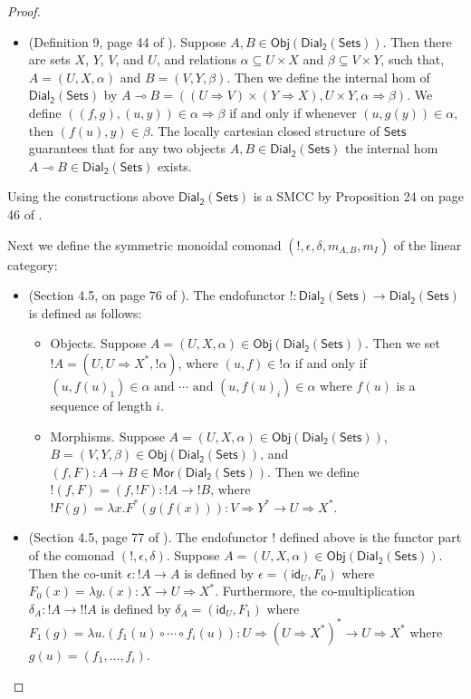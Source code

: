 \documentclass{elsarticle}
\newcommand{\limp}[0]{\multimap}
\newcommand{\dial}[0]{\mathsf{Dial_2}(\mathsf{Sets})}
\newcommand{\sets}[0]{\mathsf{Sets}}
\newcommand{\obj}[1]{\mathsf{Obj}(#1)}
\newcommand{\mor}[1]{\mathsf{Mor(#1)}}
\begin{document}
\begin{proof}
\begin{report}
\begin{center}
\begin{itemize}
    \item (Definition 9, page 44 of \cite{dePaiva:1988}). Suppose
      $A,B \in \obj{\dial}$.  Then there are sets $X$, $Y$, $V$, and
      $U$, and relations $\alpha \subseteq U \times X$ and
      $\beta \subseteq V \times Y$, such that, $A = (U,X,\alpha)$ and
      $B = (V,Y,\beta)$.  Then we define the internal hom of $\dial$
      by $A \limp B = ((U \Rightarrow V) \times (Y \Rightarrow X),U
      \times Y,\alpha \Rightarrow \beta)$.  We define $((f,g),(u,y))
      \in \alpha \Rightarrow \beta$ if and only if whenever $(u,g(y))
      \in \alpha$, then $(f(u),y) \in \beta$.  The locally cartesian 
      closed structure of $\sets$ guarantees that for any two objects $A, B \in
      \dial$ the internal hom $A \limp B \in \dial$ exists.      
    \end{itemize}
  \end{center}
  Using the constructions above $\dial$ is a SMCC by Proposition 24
  on page 46 of \cite{dePaiva:1988}.  

  Next we define the symmetric monoidal comonad
  $(!,\epsilon,\delta,m_{A,B},m_I)$ of the linear category:
  \begin{center}
    \begin{itemize}
    \item (Section 4.5, on page 76 of \cite{dePaiva:1988}). The
      endofunctor $! : \dial \to \dial$ is defined as follows:
      \begin{itemize}
      \item Objects. Suppose $A = (U,X,\alpha) \in \obj{\dial}$.  Then
        we set $!A = (U,U \Rightarrow X^*, !\alpha)$, where
        $(u,f) \in !\alpha$ if and only if
        $(u,f(u)_1) \in \alpha \text{ and } \cdots \text{ and }
        (u,f(u)_i) \in \alpha$ where $f(u)$ is a sequence of length $i$.

      \item Morphisms. Suppose $A = (U,X,\alpha) \in \obj{\dial}$,
        $B = (V,Y,\beta) \in \obj{\dial}$, and
        $(f,F) : A \to B \in \mor{\dial}$.  Then we define 
        $!(f,F) = (f,!F) : !A \to !B$, where $!F(g) = \lambda
        x.F^*(g(f(x))) : V \Rightarrow Y^* \to U \Rightarrow X^*$.
      \end{itemize}

    \item (Section 4.5, page 77 of \cite{dePaiva:1988}). The
      endofunctor $!$ defined above is the functor part of the comonad
      $(!,\epsilon, \delta)$.  Suppose
      $A = (U,X,\alpha) \in \obj{\dial}$. Then the co-unit
      $\epsilon : !A \to A$ is defined by $\epsilon =
      (\mathsf{id}_U,F_0)$ where $F_0(x) = \lambda y.(x) : X \to U
      \Rightarrow X^*$.  
      Furthermore, the co-multiplication $\delta_A
      : !A \to !!A$ is defined by $\delta_A = (\mathsf{id}_U,F_1)$
      where $F_1(g) = \lambda u.(f_1(u) \circ \cdots \circ f_i(u)) : U \Rightarrow (U
      \Rightarrow X^*)^* \to U \Rightarrow X^*$ where $g(u) = (f_1,\ldots,f_i)$.


\end{itemize}
\end{center}
\end{report}
\end{proof}
\end{document}

